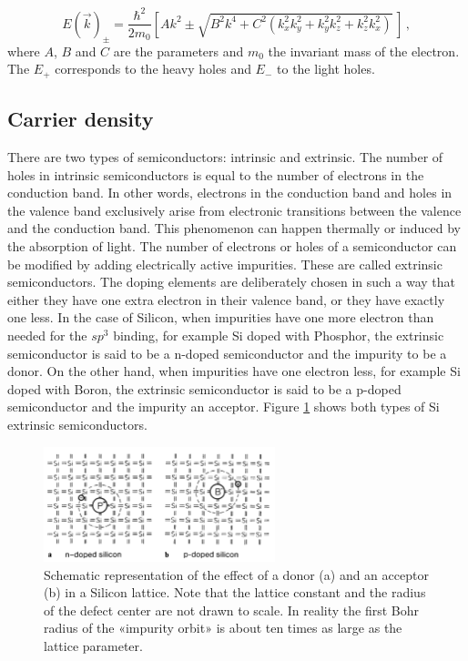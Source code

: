 \documentclass[11pt,a4paper]{article}
\begin{document}
\begin{equation}\label{eq:energy_dispersion_alt}
E(\vec{k})_\pm=\frac{\hbar^2}{2m_0}\left[Ak^2\pm\sqrt{B^2k^4+C^2(k_x^2k_y^2+k_y^2k_z^2+k_z^2k_x^2)}\,\right]\,,
\end{equation}
where $A$, $B$ and $C$ are the parameters and $m_0$ the invariant mass of the electron. The $E_+$ corresponds to the heavy holes and $E_-$ to the light holes.

\subsection{Carrier density}

There are two types of semiconductors: intrinsic and extrinsic. The number of holes in intrinsic semiconductors is equal to the number of electrons in the conduction band. In other words, electrons in the conduction band and holes in the valence band exclusively arise from electronic transitions between the valence and the conduction band. This phenomenon can happen thermally or induced by the absorption of light. The number of electrons or holes of a semiconductor can be modified by adding electrically active impurities. These are called extrinsic semiconductors. The doping elements are deliberately chosen in such a way that either they have one extra electron in their valence band, or they have exactly one less. In the case of Silicon, when impurities have one more electron than needed for the $sp^3$ binding, for example Si doped with Phosphor, the extrinsic semiconductor is said to be a n-doped semiconductor and the impurity to be a donor. On the other hand, when impurities have one electron less, for example Si doped with Boron, the extrinsic semiconductor is said to be a p-doped semiconductor and the impurity an acceptor. Figure \ref{fig:extrinsic_semiconductors} shows both types of Si extrinsic semiconductors.

\begin{figure}[ht]
\centering
\includegraphics[width=0.6\textwidth]{extrinsic_semiconductors}
\caption{Schematic representation of the effect of a donor (a) and an acceptor (b) in a Silicon lattice. Note that the lattice constant and the radius of the defect center are not drawn to scale. In reality the first Bohr radius of the «impurity orbit» is about ten times as large as the lattice parameter.\cite{ibach2009solid}}
\label{fig:extrinsic_semiconductors}
\end{figure}
\end{document}
